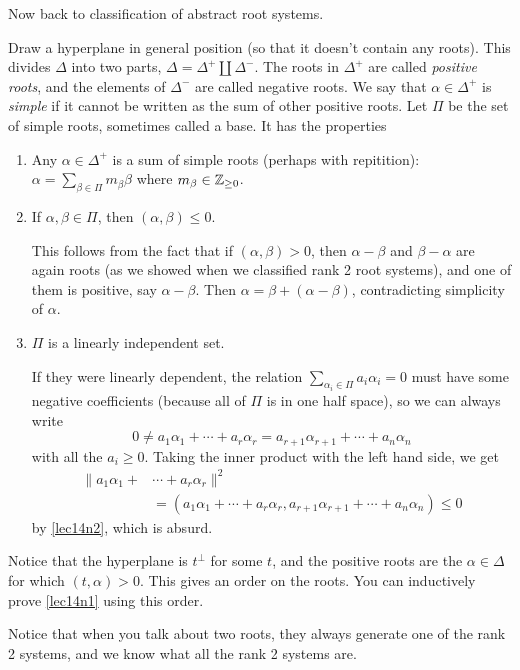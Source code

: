  Now back to classification of abstract root systems.

 Draw a hyperplane in general position (so that it doesn't contain any roots). This
 divides $\Delta$ into two parts, $\Delta = \Delta^+\coprod \Delta^-$. The roots in
 $\Delta^+$ are called \emph{positive roots}, and the elements of
 $\Delta^-$ are called negative roots. We say that $\alpha\in \Delta^+$ is
 \emph{simple} if it cannot be written as the sum of other positive
 roots. Let $\Pi$ be the set of simple roots, sometimes called a base. It has the
 properties
 \begin{enumerate}
 \item \label{lec14n1} Any $\alpha\in \Delta^+$ is a sum of simple roots (perhaps with
 repitition): $\alpha = \sum_{\beta \in \Pi} m_\beta \beta$ where $m_\beta \in
 \mathbb{Z}_{\ge 0}$.

 \item \label{lec14n2} If $\alpha, \beta\in \Pi$, then $(\alpha,\beta)\le 0$.

 This follows from the fact that if $(\alpha,\beta)>0$, then $\alpha-\beta$ and
 $\beta-\alpha$ are again roots (as we showed when we classified rank 2 root systems),
 and one of them is positive, say $\alpha-\beta$. Then $\alpha = \beta +
 (\alpha-\beta)$, contradicting simplicity of $\alpha$.

 \item \label{lec14n3} $\Pi$ is a linearly independent set.

 If they were linearly dependent, the relation $\sum_{\alpha_i\in \Pi} a_i\alpha_i =
 0$ must have some negative coefficients (because all of $\Pi$ is in one half space),
 so we can always write
 \[
    0\neq a_1\alpha_1+\cdots+ a_r\alpha_r = a_{r+1}\alpha_{r+1}+\cdots+ a_n\alpha_n
 \]
 with all the $a_i\ge 0$. Taking the inner product with the left hand side, we get
 \begin{align*}
    \|a_1\alpha_1+&\cdots+ a_r\alpha_r\|^2 \\
                &= (a_1\alpha_1+\cdots+ a_r\alpha_r, a_{r+1}\alpha_{r+1}+\cdots+ a_n\alpha_n) \le 0
 \end{align*}
 by \ref{lec14n2}, which is absurd.
 \end{enumerate}
 \begin{remark}
   Notice that the hyperplane is $t^\perp$ for some $t$, and the positive roots are the
   $\alpha \in \Delta$ for which $(t,\alpha)>0$. This gives an order on the roots. You
   can inductively prove \ref{lec14n1} using this order.
 \end{remark}
 \begin{remark}
   Notice that when you talk about two roots, they always generate one of the rank 2
   systems, and we know what all the rank 2 systems are.
 \end{remark}

